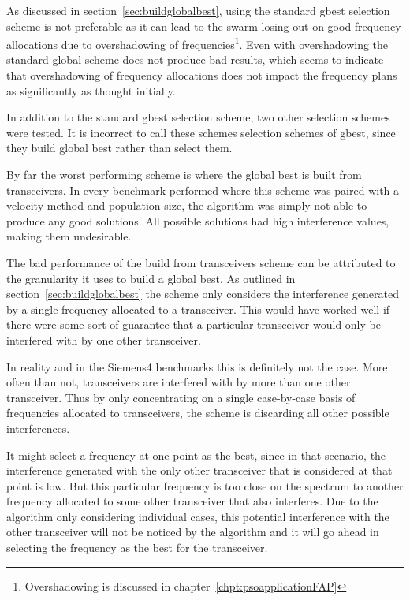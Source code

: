 As discussed in section~\ref{sec:buildglobalbest}, using the standard gbest selection scheme is not preferable as it can lead to the swarm losing out on good frequency allocations due to overshadowing of frequencies\footnote{Overshadowing is discussed in chapter~\ref{chpt:psoapplicationFAP}}.
Even with overshadowing the standard global scheme does not produce bad results, which seems to indicate that overshadowing of frequency allocations does not impact the frequency plans as significantly as thought initially.

In addition to the standard gbest selection scheme, two other selection schemes were tested. It is incorrect to call these schemes selection schemes of gbest, since they build global best rather than select them.

By far the worst performing scheme is where the global best is built from transceivers. In every benchmark performed where this scheme was paired with a velocity method and population size, the algorithm was simply not able to produce any good solutions. All possible solutions had high interference values, making them undesirable.

The bad performance of the build from transceivers scheme can be attributed to the granularity it uses to build a global best. As outlined in section~\ref{sec:buildglobalbest} the scheme only considers the interference generated by a single frequency allocated to a transceiver. This would have worked well if there were some sort of guarantee that a particular transceiver would only be interfered with by one other transceiver.

In reality and in the Siemens4 benchmarks this is definitely not the case. More often than not, transceivers are interfered with by more than one other transceiver. Thus by only concentrating on a single case-by-case basis of frequencies allocated to transceivers, the scheme is discarding all other possible interferences. 

It might select a frequency at one point as the best, since in that scenario, the interference generated with the only other transceiver that is considered at that point is low. But this particular frequency is too close on the spectrum to another frequency allocated to some other transceiver that also interferes. Due to the algorithm only considering individual cases, this potential interference with the other transceiver will not be noticed by the algorithm and it will go ahead in selecting the frequency as the best for the transceiver.

